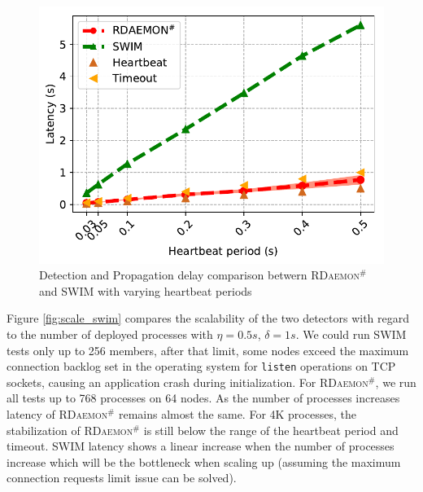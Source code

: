 \documentclass[sigconf]{acmart}
\newcommand{\ourwork}[0]{\textsc{RDaemon}\ensuremath{^\#}\xspace}
\begin{document}
\begin{figure}[h]
  \centering
  \includegraphics[width=\linewidth]{HB_prrte_swim.pdf}
  \caption{Detection and Propagation delay comparison betwern \ourwork and SWIM with varying heartbeat periods}
  \label{fig:hb_prrte_swim}
\end{figure}


Figure \ref{fig:scale_swim} compares the scalability of the two detectors with regard to the number of deployed processes with $\eta = 0.5s$, $\delta = 1s$.
We could run SWIM tests only up to 256 members, after that limit, some nodes exceed the maximum connection backlog
set in the operating system for \texttt{listen} operations on TCP sockets, causing an application crash during
initialization. For \ourwork,
we run all tests up to 768 processes on 64 nodes.
%
As the number of processes increases latency of \ourwork remains almost the same.
For 4K processes, the stabilization of \ourwork is still below the range of the heartbeat period and timeout.
SWIM latency shows a linear increase when the number of processes increase which will be the bottleneck when scaling up (assuming the maximum connection requests limit issue can be solved).
\end{document}
